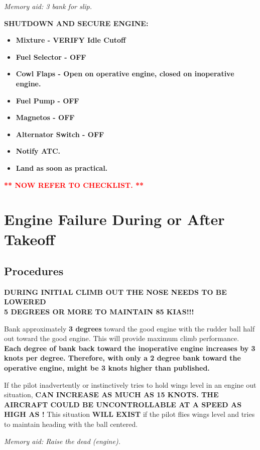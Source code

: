 \emph{Memory aid: 3\degree{} bank for slip.}

\textbf{SHUTDOWN AND SECURE ENGINE:}
\begin{itemize}
    \item \textbf{Mixture - VERIFY Idle Cutoff}
    \item \textbf{Fuel Selector - OFF}
    \item \textbf{Cowl Flaps - Open on operative engine, closed on inoperative engine.}
    \item \textbf{Fuel Pump - OFF}
    \item \textbf{Magnetos - OFF}
    \item \textbf{Alternator Switch - OFF}
    \item \textbf{Notify ATC.}
    \item \textbf{Land as soon as practical.}
\end{itemize}

\textbf{\textcolor{red}{** NOW REFER TO CHECKLIST. **}}


\section{Engine Failure During or After Takeoff}

\subsection{Procedures}

{\centering
\textbf{DURING INITIAL CLIMB OUT THE NOSE NEEDS TO BE LOWERED\\
5 DEGREES OR MORE TO MAINTAIN 85 KIAS!!!}
\par }

Bank approximately \textbf{3 degrees} toward the good engine with the rudder ball half out toward the good engine. This
will provide maximum climb performance. \textbf{Each degree of bank back toward the inoperative engine increases \vmc
by 3 knots per degree. Therefore, with only a 2 degree bank toward the operative engine, \vmc might be 3 knots higher
than published.}

If the pilot inadvertently or instinctively tries to hold wings level in an engine out situation, \vmc
\textbf{CAN INCREASE AS MUCH AS 15 KNOTS. THE AIRCRAFT COULD BE UNCONTROLLABLE AT A
SPEED AS HIGH AS \vyse!} This situation \textbf{WILL EXIST} if the pilot flies wings level and tries to maintain heading
with the ball centered.

\emph{Memory aid: Raise the dead (engine).}

